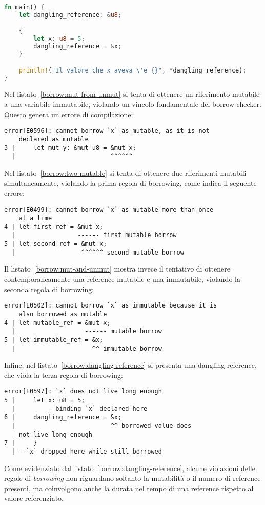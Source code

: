 \begin{lstlisting}[language=Rust, caption={Reference non valida: \textit{dangling reference}}, label={borrow:dangling-reference}]
fn main() {
    let dangling_reference: &u8;

    {
        let x: u8 = 5;
        dangling_reference = &x;
    }

    println!("Il valore che x aveva \'e {}", *dangling_reference);
}
\end{lstlisting}
Nel listato~\ref{borrow:mut-from-unmut} si tenta di ottenere un riferimento mutabile a una variabile immutabile, violando un vincolo fondamentale del borrow checker. Questo genera un errore di compilazione:
\begin{verbatim}
error[E0596]: cannot borrow `x` as mutable, as it is not 
    declared as mutable
3 |     let mut y: &mut u8 = &mut x;
  |                          ^^^^^^
\end{verbatim}
\noindent Nel listato~\ref{borrow:two-mutable} si tenta di ottenere due riferimenti mutabili simultaneamente, violando la prima regola di borrowing, come indica il seguente errore:
\begin{verbatim}
error[E0499]: cannot borrow `x` as mutable more than once 
    at a time
4 | let first_ref = &mut x;
  |                 ------ first mutable borrow
5 | let second_ref = &mut x;
  |                  ^^^^^^ second mutable borrow
\end{verbatim}
\noindent Il listato~\ref{borrow:mut-and-unmut} mostra invece il tentativo di ottenere contemporaneamente una reference mutabile e una immutabile, violando la seconda regola di borrowing:
\begin{verbatim}
error[E0502]: cannot borrow `x` as immutable because it is 
    also borrowed as mutable
4 | let mutable_ref = &mut x;
  |                   ------ mutable borrow
5 | let immutable_ref = &x;
  |                     ^^ immutable borrow
\end{verbatim}
\noindent Infine, nel listato~\ref{borrow:dangling-reference} si presenta una dangling reference, che viola la terza regola di borrowing:
\begin{verbatim}
error[E0597]: `x` does not live long enough
5 |     let x: u8 = 5;
  |         - binding `x` declared here
6 |     dangling_reference = &x;
  |                          ^^ borrowed value does 
    not live long enough
7 |     }
  | - `x` dropped here while still borrowed
\end{verbatim}
\vspace{5pt}
Come evidenziato dal listato~\ref{borrow:dangling-reference}, alcune violazioni delle regole di \textit{borrowing} non riguardano soltanto la mutabilità o il numero di reference presenti, ma coinvolgono anche la durata nel tempo di una reference rispetto al valore referenziato.

